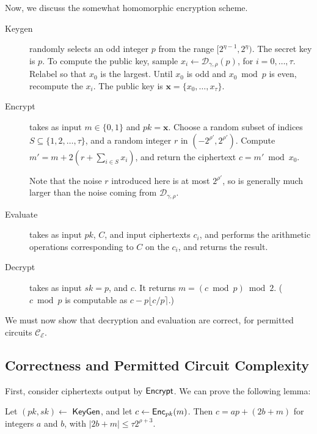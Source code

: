 Now, we discuss the somewhat homomorphic encryption scheme.
\begin{description}
\item[Keygen] randomly selects an odd integer $p$ from the range $[2^{\eta - 1}, 2^\eta)$. The secret key is $p$. To compute the public key, sample $x_i \leftarrow \mathcal{D}_{\gamma, \rho}(p)$, for $i = 0, \dots, \tau$. Relabel so that $x_0$ is the largest. Until $x_0$ is odd and $x_0 \bmod p$ is even, recompute the $x_i$. The public key is $\mathbf{x} = \{x_0, \dots, x_\tau\}$.
\item[Encrypt] takes as input $m \in \{0, 1\}$ and $pk = \mathbf{x}$. Choose a random subset of indices $S \subseteq \{1, 2, \dots, \tau\}$, and a random integer $r$ in $(-2^{\rho'}, 2^{\rho'})$. Compute $m' = m + 2(r + \sum_{i \in S} x_i)$, and return the ciphertext $c = m' \bmod x_0$.

Note that the noise $r$ introduced here is at most $2^{\rho'}$, so is generally much larger than the noise coming from $\mathcal{D}_{\gamma, \rho}$.

\item[Evaluate] takes as input $pk$, $C$, and input ciphertexts $c_i$, and performs the arithmetic operations corresponding to $C$ on the $c_i$, and returns the result.
\item[Decrypt] takes as input $sk = p$, and $c$. It returns $m = (c \bmod p) \bmod 2$. ($c \bmod p$ is computable as $c - p \lfloor c / p \rceil$.)

\end{description}

We must now show that decryption and evaluation are correct, for permitted circuits $\mathcal{C}_\mathcal{E}$.
\subsection{Correctness and Permitted Circuit Complexity} \label{sec:dghv_correctness}
First, consider ciphertexts output by ${\sf Encrypt}$. We can prove the following lemma:
\begin{lemma}
Let $(pk, sk) \leftarrow$ ${\sf KeyGen}$, and let $c \leftarrow {\sf Enc}_{pk}(m)$. Then $c = ap + (2b + m)$ for integers $a$ and $b$, with $|2b+m| \leq \tau 2^{\rho + 3}.$
\end{lemma}

